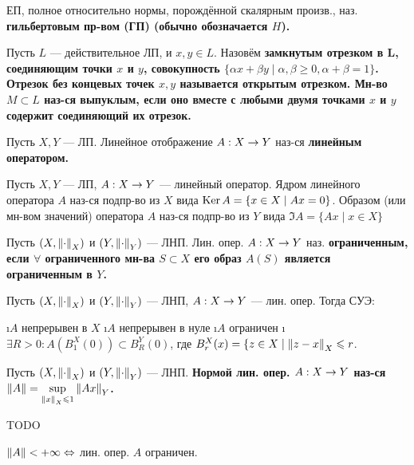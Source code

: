 \begin{defn}
ЕП, полное относительно нормы, порождённой скалярным произв., наз. \bf{гильбертовым пр-вом (ГП)} (обычно обозначается $H$).
\end{defn}

\begin{defn}
Пусть $L$ --- действительное ЛП, и $x, y \in L$. Назовём \bf{замкнутым отрезком} в L, соединяющим точки $x$ и $y$, совокупность $\{\alpha x + \beta y \mid \alpha, \beta \ge 0, \alpha + \beta = 1\}$. Отрезок без концевых точек $x, y$ называется \bf{открытым отрезком}.
Мн-во $M \subset L$ наз-ся выпуклым, если оно вместе с любыми двумя точками $x$ и $y$ содержит соединяющий их отрезок.
\end{defn}

\begin{defn}
Пусть $X, Y$ --- ЛП. Линейное отображение $A: X \rightarrow Y$ наз-ся \bf{линейным оператором}.
\end{defn}

\begin{defn}
Пусть $X, Y$ --- ЛП, $A: X \rightarrow Y$ --- линейный оператор. Ядром линейного оператора $A$ наз-ся подпр-во из $X$ вида $\operatorname{Ker} A = \{x \in X \mid Ax = 0\}$. Образом (или мн-вом значений) оператора $A$ наз-ся подпр-во из $Y$ вида $\Im A = \{Ax \mid x \in X\}$
\end{defn}

\begin{defn}
Пусть $(X, \left\lVert\cdot\right\rVert_X)$ и $(Y, \left\lVert\cdot\right\rVert_Y)$ --- ЛНП. Лин. опер. $A: X \rightarrow Y$ наз. \bf{ограниченным}, если $\forall$ ограниченного мн-ва $S \subset X$ его образ $A(S)$ является ограниченным в $Y$. 
\end{defn}

\begin{stmt}
Пусть $(X, \left\lVert\cdot\right\rVert_X)$ и $(Y, \left\lVert\cdot\right\rVert_Y)$ --- ЛНП, $A: X \rightarrow Y$ --- лин. опер. Тогда СУЭ:
\begin{enumerate}
\i $A$ непрерывен в $X$
\i $A$ непрерывен в нуле
\i $A$ ограничен
\i $\exists R > 0: A(B_1^X(0)) \subset B_R^Y(0)$, где $B_r^X (x) = \{z \in X \mid \left\lVert z-x\right\rVert_X \leqslant r$.
\end{enumerate}
\end{stmt}

\begin{defn}
Пусть $(X, \left\lVert\cdot\right\rVert_X)$ и $(Y, \left\lVert\cdot\right\rVert_Y)$ --- ЛНП. \bf{Нормой} лин. опер. $A: X \rightarrow Y$ наз-ся $\left\lVert A\right\rVert = \sup\limits_{\left\lVert x\right\rVert_X \leqslant 1} \left\lVert Ax\right\rVert_Y$.
\end{defn}

\begin{stmt}
TODO
\end{stmt}

\begin{defn}
$\left\lVert A\right\rVert < +\infty \Leftrightarrow $ лин. опер. $A$ ограничен.
\end{defn}

\begin{defn}

\end{defn}


